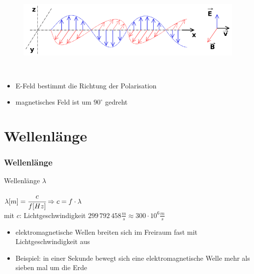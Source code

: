 \begin{frame}
\begin{center}
\begin{minipage}{0.45\textwidth}
\begin{figure}
        \includegraphics[width=\textwidth,height=.8\textheight,keepaspectratio]{e08/Onde_electromagnetique.png}
      \end{figure}
    \end{minipage}\\[1.5em]

    \begin{itemize}
      \item E-Feld bestimmt die Richtung der Polarisation
      \item magnetisches Feld ist um $90^\circ$ gedreht
    \end{itemize}

  \end{center}

\end{frame}

\section*{Wellenlänge}

\begin{frame}
  \frametitle{Wellenlänge}

  \begin{center}
    \begin{block}{Wellenlänge $\lambda$}
      \begin{center}
        {\Huge$ \lambda [m] = \cfrac{c}{f [Hz]} \Rightarrow
        c = f \cdot \lambda $} \\[1em]
        mit $c$: Lichtgeschwindigkeit $299\,792\,458 \frac{m}{s} \approx
        300\cdot10^6\frac{m}{s}$
      \end{center}
    \end{block}

    \begin{normalsize}
      \begin{itemize}
        \item elektromagnetische Wellen breiten sich im Freiraum fast mit Lichtgeschwindigkeit aus
        \item Beispiel: in einer Sekunde bewegt sich eine elektromagnetische Welle mehr als sieben mal um die Erde
      \end{itemize}
    \end{normalsize}
  \end{center}
\end{frame}


